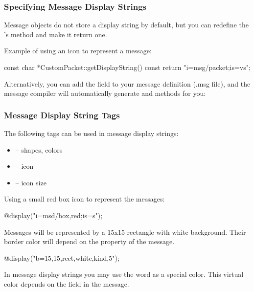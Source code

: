 \subsubsection{Specifying Message Display Strings}

Message objects do not store a display string by default, but you can redefine
the 's  method and make it return
one.

Example of using an icon to represent a message:

\begin{cpp}
const char *CustomPacket::getDisplayString() const
{
    return "i=msg/packet;is=vs";
}
\end{cpp}

Alternatively, you can add the field  to your message
definition (.msg file), and the message compiler will automatically generate
 and  methods for you:

\begin{msg}
message Job
{
    string displayString = "i=msg/package_s,kind";
...
\end{msg}

\subsubsection{Message Display String Tags}

The following tags can be used in message display strings:
\begin{itemize}
  \item{ -- shapes, colors}
  \item{ -- icon}
  \item{ -- icon size}
\end{itemize}

Using a small red box icon to represent the messages:

\begin{ned}
@display("i=msd/box,red;is=s");
\end{ned}

Messages will be represented by a 15x15 rectangle with white background.
Their border color will depend on the  property of the message.

\begin{ned}
@display("b=15,15,rect,white,kind,5");
\end{ned}

\begin{note}
   In message display strings you may use the word  as a special color.
   This virtual color depends on the  field in the message.
\end{note}

